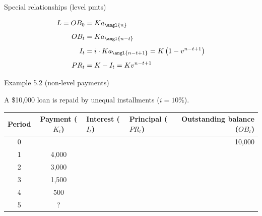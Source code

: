 \documentclass{beamer}
\begin{document}
\begin{frame}{Special relationships (level pmts)}

\begin{align*}
L = OB_0 &= K a_{\angl{n}} \\[1ex]
OB_t &= K a_{\angl{n-t}} \\[1ex]
I_t &= i \cdot K a_{\angl{n-t+1}} = K\left(1 - v^{n-t+1}\right) \\[1ex]
PR_t &= K - I_t = K v^{n-t+1}
\end{align*}

\end{frame}

\begin{frame}{Example 5.2 (non-level payments)}

A \$10,000 loan is repaid by unequal installments ($i = 10\%$).

\begin{center}
\small
\renewcommand{\arraystretch}{1.5}
\begin{tabular}{c c p{} p{} r}
\toprule
Period & \shortstack{Payment\\($K_t$)} & \shortstack{Interest\\($I_t$)} & \shortstack{Principal\\($PR_t$)} & \shortstack{Outstanding\\balance ($OB_t$)} \\
\midrule
0 & & & & 10,000 \\
1 & 4,000 & & & \\
2 & 3,000 & & & \\
3 & 1,500 & & & \\
4 & 500 & & & \\
5 & ? & & & \\
\bottomrule
\end{tabular}
\end{center}

\end{frame}
\end{document}
